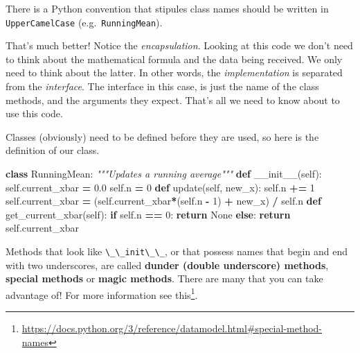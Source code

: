 \documentclass[
  12pt,
]{krantz}
\makeatletter
\newenvironment{Shaded}{\begin{snugshade}}{\end{snugshade}}
\newcommand{\CommentTok}[1]{\textcolor[rgb]{0.37,0.37,0.37}{\textit{#1}}}
\newcommand{\ControlFlowTok}[1]{\textcolor[rgb]{0.27,0.27,0.27}{\textbf{#1}}}
\newcommand{\DecValTok}[1]{\textcolor[rgb]{0.06,0.06,0.06}{#1}}
\newcommand{\FloatTok}[1]{\textcolor[rgb]{0.06,0.06,0.06}{#1}}
\newcommand{\FunctionTok}[1]{\textcolor[rgb]{0,0,0}{#1}}
\newcommand{\KeywordTok}[1]{\textcolor[rgb]{0.27,0.27,0.27}{\textbf{#1}}}
\newcommand{\NormalTok}[1]{#1}
\newcommand{\OperatorTok}[1]{\textcolor[rgb]{0.43,0.43,0.43}{\textbf{#1}}}
\newcommand{\VariableTok}[1]{\textcolor[rgb]{0,0,0}{#1}}
\renewcommand{\href}[2]{#2\footnote{\url{#1}}}
\newenvironment{kframe}{%
\medskip{}
\setlength{\fboxsep}{.8em}
 \def\at@end@of@kframe{}%
 \ifinner\ifhmode%
  \def\at@end@of@kframe{\end{minipage}}%
  \begin{minipage}{\columnwidth}%
 \fi\fi%
 \def\FrameCommand##1{\hskip\@totalleftmargin \hskip-\fboxsep
 \colorbox{shadecolor}{##1}\hskip-\fboxsep
     \hskip-\linewidth \hskip-\@totalleftmargin \hskip\columnwidth}%
 \MakeFramed {\advance\hsize-\width
   \@totalleftmargin\z@ \linewidth\hsize
   \@setminipage}}%
 {\par\unskip\endMakeFramed%
 \at@end@of@kframe}
\renewenvironment{Shaded}{\begin{kframe}}{\end{kframe}}
\makeatother
\begin{document}
There is a Python convention that stipules class names should be written in \texttt{UpperCamelCase} (e.g.~\texttt{RunningMean}).

That's much better! Notice the \emph{encapsulation}. Looking at this code we don't need to think about the mathematical formula and the data being received. We only need to think about the latter. In other words, the \emph{implementation} is separated from the \emph{interface}. The interface in this case, is just the name of the class methods, and the arguments they expect. That's all we need to know about to use this code.

Classes (obviously) need to be defined before they are used, so here is the definition of our class.

\begin{Shaded}
\begin{Highlighting}[]
\KeywordTok{class}\NormalTok{ RunningMean:}
  \CommentTok{"""Updates a running average"""}
  \KeywordTok{def} \FunctionTok{\_\_init\_\_}\NormalTok{(}\VariableTok{self}\NormalTok{):}
    \VariableTok{self}\NormalTok{.current\_xbar }\OperatorTok{=} \FloatTok{0.0}
    \VariableTok{self}\NormalTok{.n }\OperatorTok{=} \DecValTok{0}
  \KeywordTok{def}\NormalTok{ update(}\VariableTok{self}\NormalTok{, new\_x):}
    \VariableTok{self}\NormalTok{.n }\OperatorTok{+=} \DecValTok{1}
    \VariableTok{self}\NormalTok{.current\_xbar }\OperatorTok{=}\NormalTok{ (}\VariableTok{self}\NormalTok{.current\_xbar}\OperatorTok{*}\NormalTok{(}\VariableTok{self}\NormalTok{.n }\OperatorTok{{-}} \DecValTok{1}\NormalTok{) }\OperatorTok{+}\NormalTok{ new\_x) }\OperatorTok{/} \VariableTok{self}\NormalTok{.n}
  \KeywordTok{def}\NormalTok{ get\_current\_xbar(}\VariableTok{self}\NormalTok{):}
    \ControlFlowTok{if} \VariableTok{self}\NormalTok{.n }\OperatorTok{==} \DecValTok{0}\NormalTok{:}
      \ControlFlowTok{return} \VariableTok{None}
    \ControlFlowTok{else}\NormalTok{:}
      \ControlFlowTok{return} \VariableTok{self}\NormalTok{.current\_xbar}
\end{Highlighting}
\end{Shaded}

Methods that look like \texttt{\textbackslash{}\_\textbackslash{}\_init\textbackslash{}\_\textbackslash{}\_}, or that possess names that begin and end with two underscores, are called \textbf{dunder (double underscore) methods}, \textbf{special methods} or \textbf{magic methods}. There are many that you can take advantage of! For more information see \href{https://docs.python.org/3/reference/datamodel.html\#special-method-names}{this}.
\end{document}
